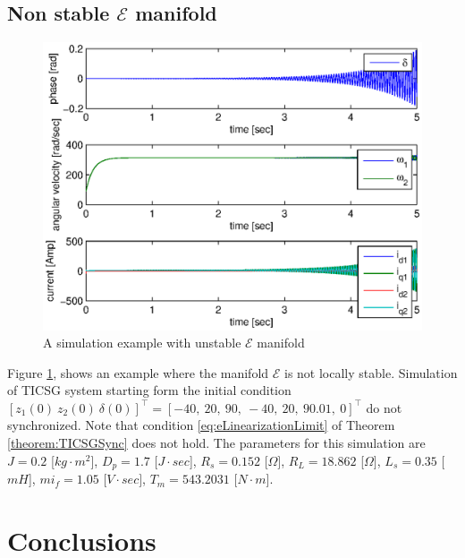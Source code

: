 \documentclass[letterpaper,10pt,conference]{ieeeconf}
\newcommand{\Emscr}  {{\mathcal{E}}}
\begin{document}
\subsection{Non stable $\mathscr{E}$ manifold}

\begin{figure}[ht]
\includegraphics[scale=0.65]{NonStableTICSGSimulation}

\caption{A simulation example with unstable $\Emscr$ manifold}
\label{fig:NonStableTICSGSimulation}
\end{figure}

Figure \ref{fig:NonStableTICSGSimulation}, shows an example where the
manifold $\mathscr{E}$ is not locally stable. Simulation of TICSG
system starting form the initial condition $\left[z_1(0)\ z_2(0) \
\delta(0) \right]^\top = \left[ -40, \ 20, \ 90, \ -40, \ 20, \ 90.01,
\ 0 \right]^\top$ do not synchronized. Note that condition
\eqref{eq:eLinearizationLimit} of Theorem \ref{theorem:TICSGSync} does
not hold. The parameters for this simulation are $J=0.2$
{[}$kg\cdot m^{2}${]}, $D_p=1.7$ {[}$J\cdot sec${]}, $R_s=0.152$
{[}$\Omega]$, $R_L=18.862$ {[}$\Omega]$, $L_s=0.35$ {[}$mH${]},
$mi_f=1.05$ {[}$V\cdot sec]$, $T_m=543.2031$ {[}$N\cdot m${]}.

\section{Conclusions}
\end{document}
